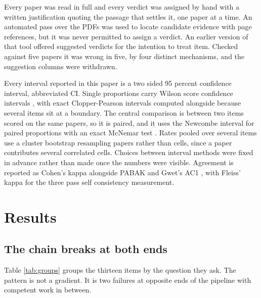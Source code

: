 \documentclass{article}
\begin{document}
Every paper was read in full and every verdict was assigned by hand with a written justification
quoting the passage that settles it, one paper at a time. An automated pass over the PDFs was used
to locate candidate evidence with page references, but it was never permitted to assign a verdict.
An earlier version of that tool offered suggested verdicts for the intention to treat item. Checked
against five papers it was wrong in five, by four distinct mechanisms, and the suggestion columns
were withdrawn.

Every interval reported in this paper is a two sided 95 percent confidence interval, abbreviated CI.
Single proportions carry Wilson score confidence intervals \cite{wilson1927,newcombe1998a}, with exact
Clopper-Pearson intervals \cite{clopper1934} computed alongside because several items sit at a
boundary. The central comparison is between two items scored on the same papers, so it is paired,
and it uses the Newcombe interval for paired proportions \cite{newcombe1998b} with an exact McNemar
test \cite{mcnemar1947}. Rates pooled over several items use a cluster bootstrap
\cite{efron1993} resampling papers rather than cells, since a paper contributes several correlated
cells. Choices between interval methods were fixed in advance rather than made once the numbers
were visible. Agreement is reported as Cohen's kappa \cite{cohen1960} alongside PABAK
\cite{byrt1993} and Gwet's AC1 \cite{gwet2008}, with Fleiss' kappa \cite{fleiss1971} for the three
pass self consistency measurement.

\section{Results}

\subsection{The chain breaks at both ends}

Table \ref{tab:groups} groups the thirteen items by the question they ask. The pattern is not a
gradient. It is two failures at opposite ends of the pipeline with competent work in between.
\end{document}
